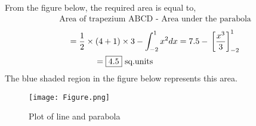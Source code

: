 \documentclass[journal,12pt,twocolumn]{IEEEtran}
\providecommand{\sbrak}[1]{\ensuremath{{}\left[#1\right]}}
\theoremstyle{remark}
\begin{document}
From the figure below, the required area is equal to,
\begin{align}
    \text{Area of trapezium ABCD - Area under the parabola}
\end{align}
\begin{multline}
    = \frac{1}{2}\times (4 + 1)\times 3 - \int_{-2}^{1} x^2 dx = 7.5 - \sbrak{\frac{x^3}{3}}_{-2}^1 \\
    = \text{\fbox{4.5} sq.units \hspace{2.4cm}}
\end{multline}
The blue shaded region in the figure below represents this area.
\begin{figure}[ht]
    \centering
    \texttt{[image: Figure.png]}
    \caption{Plot of line and parabola}
    \label{Figure}
\end{figure}
\end{document}
